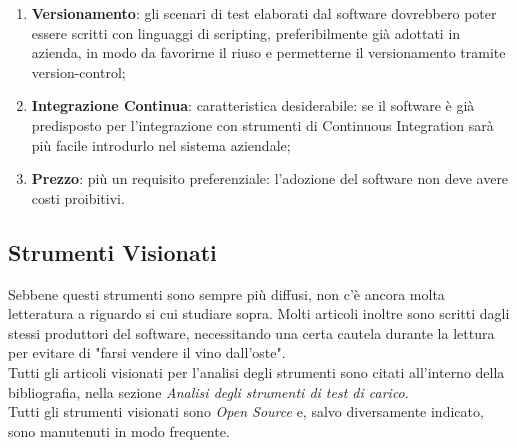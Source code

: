 \begin{enumerate}
	\item \textbf{Versionamento}: gli scenari di test elaborati dal software dovrebbero poter essere scritti con linguaggi di scripting, preferibilmente già adottati in azienda, in modo da favorirne il riuso e permetterne il versionamento tramite \gls{version-control};
	\item \textbf{Integrazione Continua}: caratteristica desiderabile: se il software è già predisposto per l'integrazione con strumenti di Continuous Integration sarà più facile introdurlo nel sistema aziendale;
	\item \textbf{Prezzo}: più un requisito preferenziale: l'adozione del software non deve avere costi proibitivi.
\end{enumerate}
\subsection{Strumenti Visionati}
Sebbene questi strumenti sono sempre più diffusi, non c'è ancora molta letteratura a riguardo si cui studiare sopra. Molti articoli inoltre sono scritti dagli stessi produttori del software, necessitando una certa cautela durante la lettura per evitare di "farsi vendere il vino dall'oste".\\
Tutti gli articoli visionati per l'analisi degli strumenti sono citati all'interno della bibliografia, nella sezione \textit{Analisi degli strumenti di test di carico}.\\
Tutti gli strumenti visionati sono \textit{Open Source} e, salvo diversamente indicato, sono manutenuti in modo frequente.

